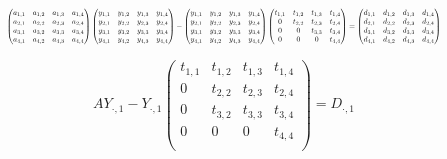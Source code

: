 \documentclass[]{article}
\begin{document}
\begin{equation}
\resizebox{.9\hsize}{!}{$
\begin{pmatrix}
	a_{1,1} & a_{1,2} & a_{1,3}  & a_{1,4} \\
	a_{2,1} & a_{2,2} & a_{2,3}  & a_{2,4} \\
	a_{3,1} & a_{3,2} & a_{3,3}  & a_{3,4} \\
	a_{4,1} & a_{4,2} & a_{4,3}  & a_{4,4} \\
\end{pmatrix}
\begin{pmatrix}
y_{1,1} & y_{1,2} & y_{1,3}  & y_{1,4} \\
y_{2,1} & y_{2,2} & y_{2,3}  & y_{2,4} \\
y_{3,1} & y_{3,2} & y_{3,3}  & y_{3,4} \\
y_{4,1} & y_{4,2} & y_{4,3}  & y_{4,4} \\
\end{pmatrix}
-
\begin{pmatrix}
y_{1,1} & y_{1,2} & y_{1,3}  & y_{1,4} \\
y_{2,1} & y_{2,2} & y_{2,3}  & y_{2,4} \\
y_{3,1} & y_{3,2} & y_{3,3}  & y_{3,4} \\
y_{4,1} & y_{4,2} & y_{4,3}  & y_{4,4} \\
\end{pmatrix}
\begin{pmatrix}
t_{1,1} & t_{1,2} & t_{1,3}  & t_{1,4} \\
0 & t_{2,2} & t_{2,3}  & t_{2,4} \\
0 & 0 & t_{3,3}  & t_{3,4} \\
0 & 0 & 0  & t_{4,4} \\
\end{pmatrix}
=
\begin{pmatrix}
d_{1,1} & d_{1,2} & d_{1,3}  & d_{1,4} \\
d_{2,1} & d_{2,2} & d_{2,3}  & d_{2,4} \\
d_{3,1} & d_{3,2} & d_{3,3}  & d_{3,4} \\
d_{4,1} & d_{4,2} & d_{4,3}  & d_{4,4} \\
\end{pmatrix}
$}
\end{equation}


\begin{equation}
	AY_{\cdot,1}-Y_{\cdot,1}
	\begin{pmatrix}
	t_{1,1} & t_{1,2} & t_{1,3}  & t_{1,4} \\
	0 & t_{2,2} & t_{2,3}  & t_{2,4} \\
	0 & t_{3,2} & t_{3,3}  & t_{3,4} \\
	0 & 0 & 0  & t_{4,4} \\
	\end{pmatrix}
	=
	D_{\cdot,1}
\end{equation}
\end{document}
